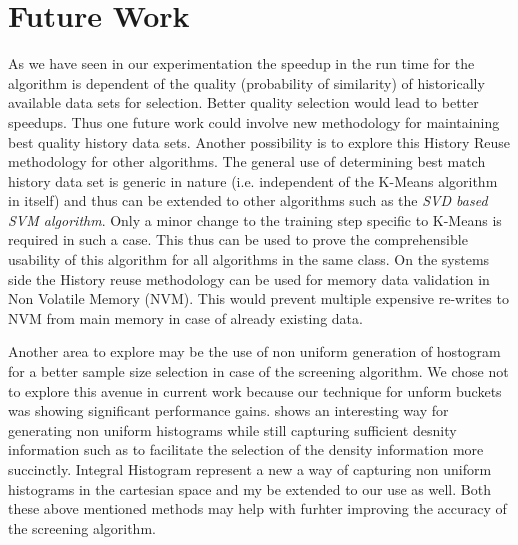 \chapter{Future Work}
\label{chap-six}
As we have seen in our experimentation the speedup in the run time for the algorithm is dependent of the quality (probability of similarity) of historically available data sets for selection. Better quality selection would lead to better speedups. Thus one future work could involve new methodology for maintaining best quality history data sets.
Another possibility is to explore this History Reuse methodology for other algorithms. The general use of determining best match history data set is generic in nature (i.e. independent of the K-Means algorithm in itself) and thus can be extended to other algorithms such as the \textit{SVD based SVM algorithm}. Only a minor change to the training step specific to K-Means is required in such a case. This thus can be used to prove the comprehensible usability of this algorithm for all algorithms in the same class.
On the systems side the History reuse methodology can be used for memory data validation in Non Volatile Memory (NVM). This would prevent multiple expensive re-writes to NVM from main memory in case of already existing data.

Another area to explore may be the use of non uniform generation of hostogram for a better sample size selection in case of the screening algorithm. We chose not to explore this avenue in current work because our technique for unform buckets was showing significant performance gains. \cite{non_uniform_hist_1} shows an interesting way for generating non uniform histograms while still capturing sufficient desnity information such as to facilitate the selection of the density information more succinctly. Integral Histogram\cite{non_uniform_hist_2} represent a new a way of capturing non uniform histograms in the cartesian space and my be extended to our use as well. Both these above mentioned methods may help with furhter improving the accuracy of the screening algorithm.